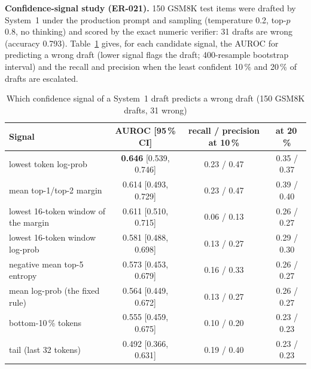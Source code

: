 \textbf{Confidence-signal study (ER-021).} 150 GSM8K test items were drafted by
System~1 under the production prompt and sampling (temperature 0.2, top-$p$ 0.8,
no thinking) and scored by the exact numeric verifier: 31 drafts are wrong
(accuracy 0.793). Table~\ref{tab:signals} gives, for each candidate signal, the
AUROC for predicting a wrong draft (lower signal flags the draft; 400-resample
bootstrap interval) and the recall and precision when the least confident 10\,\%
and 20\,\% of drafts are escalated.

\begin{table}[t]
\caption{Which confidence signal of a System~1 draft predicts a wrong draft (150 GSM8K drafts, 31 wrong)}
\label{tab:signals}
\centering\small
\begin{tabular}{@{}lccc@{}}
\toprule
Signal & AUROC [95\,\% CI] & recall / precision at 10\,\% & at 20\,\% \\
\midrule
lowest token log-prob & \textbf{0.646} [0.539, 0.746] & 0.23 / 0.47 & 0.35 / 0.37 \\
mean top-1/top-2 margin & 0.614 [0.493, 0.729] & 0.23 / 0.47 & 0.39 / 0.40 \\
lowest 16-token window of the margin & 0.611 [0.510, 0.715] & 0.06 / 0.13 & 0.26 / 0.27 \\
lowest 16-token window log-prob \cite{fu2025deepconf} & 0.581 [0.488, 0.698] & 0.13 / 0.27 & 0.29 / 0.30 \\
negative mean top-5 entropy & 0.573 [0.453, 0.679] & 0.16 / 0.33 & 0.26 / 0.27 \\
mean log-prob (the fixed rule) & 0.564 [0.449, 0.672] & 0.13 / 0.27 & 0.26 / 0.27 \\
bottom-10\,\% tokens & 0.555 [0.459, 0.675] & 0.10 / 0.20 & 0.23 / 0.23 \\
tail (last 32 tokens) & 0.492 [0.366, 0.631] & 0.19 / 0.40 & 0.23 / 0.23 \\
\bottomrule
\end{tabular}
\end{table}

